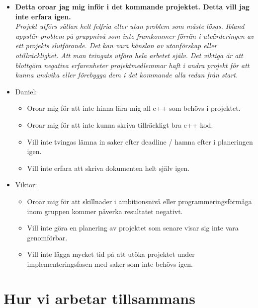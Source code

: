 \documentclass{mall}
\begin{document}
\begin{itemize}
\item \textbf{Detta oroar jag mig inför i det kommande projektet. Detta vill jag inte erfara igen.}
  \\\emph{ Projekt utförs sällan helt felfria eller utan problem som måste lösas. Ibland uppstår problem på gruppnivå som inte framkommer förrän i utvärderingen av ett projekts slutförande. Det kan vara känslan av utanförskap eller otillräcklighet. Att man tvingats utföra hela arbetet själv. Det viktiga är att blottgöra negativa erfarenheter projektmedlemmar haft i andra projekt för att kunna undvika eller förebygga dem i det kommande alla redan från start. }

\item Daniel:
  \begin{itemize}
  \item Oroar mig för att inte hinna lära mig all c++ som behövs i projektet.
  \item Oroar mig för att inte kunna skriva tillräckligt bra c++ kod.
  \item Vill inte tvingas lämna in saker efter deadline / hamna efter i planeringen igen.
  \item Vill inte erfara att skriva dokumenten helt själv igen.
  \end{itemize}


  \item Viktor:
  \begin{itemize}
  \item Oroar mig för att skillnader i ambitionsnivå eller programmeringsförmåga inom gruppen kommer påverka resultatet negativt.
  \item Vill inte göra en planering av projektet som senare visar sig inte vara genomförbar.
  \item Vill inte lägga mycket tid på att utöka projektet under implementeringsfasen med saker som inte behövs igen.
  \end{itemize}
  
\end{itemize}

\section{Hur vi arbetar tillsammans}
\end{document}
